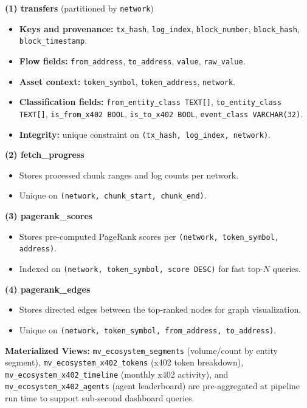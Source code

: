 \documentclass[a4paper,12pt]{report}
\begin{document}
\textbf{(1) transfers} (partitioned by \texttt{network})
\begin{itemize}
    \item \textbf{Keys and provenance:} \texttt{tx\_hash}, \texttt{log\_index}, \texttt{block\_number},
    \texttt{block\_hash}, \texttt{block\_timestamp}.
    \item \textbf{Flow fields:} \texttt{from\_address}, \texttt{to\_address}, \texttt{value},
    \texttt{raw\_value}.
    \item \textbf{Asset context:} \texttt{token\_symbol}, \texttt{token\_address}, \texttt{network}.
    \item \textbf{Classification fields:} \texttt{from\_entity\_class TEXT[]},
    \texttt{to\_entity\_class TEXT[]}, \texttt{is\_from\_x402 BOOL}, \texttt{is\_to\_x402 BOOL},
    \texttt{event\_class VARCHAR(32)}.
    \item \textbf{Integrity:} unique constraint on \texttt{(tx\_hash, log\_index, network)}.
\end{itemize}

\textbf{(2) fetch\_progress}
\begin{itemize}
    \item Stores processed chunk ranges and log counts per network.
    \item Unique on \texttt{(network, chunk\_start, chunk\_end)}.
\end{itemize}

\textbf{(3) pagerank\_scores}
\begin{itemize}
    \item Stores pre-computed PageRank scores per \texttt{(network, token\_symbol, address)}.
    \item Indexed on \texttt{(network, token\_symbol, score DESC)} for fast top-$N$ queries.
\end{itemize}

\textbf{(4) pagerank\_edges}
\begin{itemize}
    \item Stores directed edges between the top-ranked nodes for graph visualization.
    \item Unique on \texttt{(network, token\_symbol, from\_address, to\_address)}.
\end{itemize}

\textbf{Materialized Views:} \texttt{mv\_ecosystem\_segments} (volume/count by entity segment),
\texttt{mv\_ecosystem\_x402\_tokens} (x402 token breakdown), \texttt{mv\_ecosystem\_x402\_timeline}
(monthly x402 activity), and \texttt{mv\_ecosystem\_x402\_agents} (agent leaderboard) are
pre-aggregated at pipeline run time to support sub-second dashboard queries.
\end{document}
